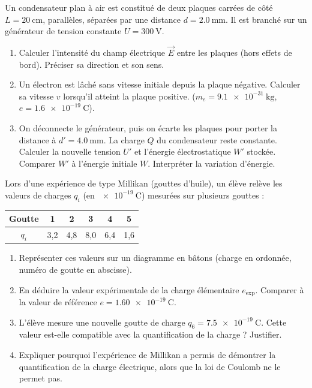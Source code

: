 \documentclass[11pt]{article}
\begin{document}
\begin{exercice}
Un condensateur plan à air est constitué de deux plaques carrées de côté $L = \SI{20}{\centi\meter}$, parallèles, séparées par une distance $d = \SI{2,0}{\milli\meter}$. Il est branché sur un générateur de tension constante $U = \SI{300}{\volt}$.
\begin{enumerate}
    \item Calculer l'intensité du champ électrique $\vec{E}$ entre les plaques (hors effets de bord). Préciser sa direction et son sens.
    \item Un électron est lâché sans vitesse initiale depuis la plaque négative. Calculer sa vitesse $v$ lorsqu'il atteint la plaque positive. ($m_e = \SI{9,1e-31}{\kilogram}$, $e = \SI{1,6e-19}{\coulomb}$).
    \item On déconnecte le générateur, puis on écarte les plaques pour porter la distance à $d' = \SI{4,0}{\milli\meter}$. La charge $Q$ du condensateur reste constante. Calculer la nouvelle tension $U'$ et l'énergie électrostatique $W'$ stockée. Comparer $W'$ à l'énergie initiale $W$. Interpréter la variation d'énergie.
\end{enumerate}
\end{exercice}

\begin{exercice}
Lors d'une expérience de type Millikan (gouttes d'huile), un élève relève les valeurs de charges $q_i$ (en $\SI{e-19}{\coulomb}$) mesurées sur plusieurs gouttes :
\begin{center}
\begin{tabular}{|c|c|c|c|c|c|}
\hline
Goutte & 1 & 2 & 3 & 4 & 5 \\ \hline
$q_i$ & 3,2 & 4,8 & 8,0 & 6,4 & 1,6 \\ \hline
\end{tabular}
\end{center}
\begin{enumerate}
    \item Représenter ces valeurs sur un diagramme en bâtons (charge en ordonnée, numéro de goutte en abscisse).
    \item En déduire la valeur expérimentale de la charge élémentaire $e_{\text{exp}}$. Comparer à la valeur de référence $e = \SI{1,60e-19}{\coulomb}$.
    \item L'élève mesure une nouvelle goutte de charge $q_6 = \SI{7,5e-19}{\coulomb}$. Cette valeur est-elle compatible avec la quantification de la charge ? Justifier.
    \item Expliquer pourquoi l'expérience de Millikan a permis de démontrer la quantification de la charge électrique, alors que la loi de Coulomb ne le permet pas.
\end{enumerate}
\end{exercice}
\end{document}
